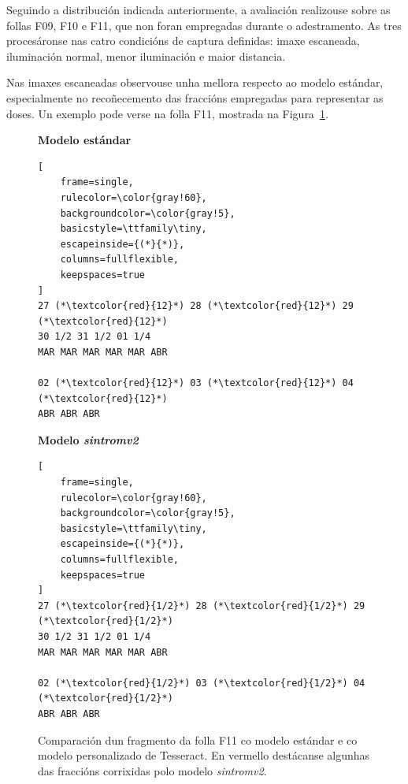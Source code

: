 Seguindo a distribución indicada anteriormente, a avaliación realizouse sobre as follas F09, F10 e F11, que non foran empregadas durante o adestramento. As tres procesáronse nas catro condicións de captura definidas: imaxe escaneada, iluminación normal, menor iluminación e maior distancia.

Nas imaxes escaneadas observouse unha mellora respecto ao modelo estándar, especialmente no recoñecemento das fraccións empregadas para representar as doses. Un exemplo pode verse na folla F11, mostrada na  Figura~\ref{fig:tesseract-comparacion-f11}.

\begin{figure}[h]
\centering

\begin{minipage}[t]{0.48\textwidth}
\centering
\textbf{Modelo estándar}

\begin{lstlisting}[
    frame=single,
    rulecolor=\color{gray!60},
    backgroundcolor=\color{gray!5},
    basicstyle=\ttfamily\tiny,
    escapeinside={(*}{*)},
    columns=fullflexible,
    keepspaces=true
]
27 (*\textcolor{red}{12}*) 28 (*\textcolor{red}{12}*) 29 (*\textcolor{red}{12}*)
30 1/2 31 1/2 01 1/4
MAR MAR MAR MAR MAR ABR

02 (*\textcolor{red}{12}*) 03 (*\textcolor{red}{12}*) 04 (*\textcolor{red}{12}*)
ABR ABR ABR
\end{lstlisting}

\end{minipage}
\hfill
\begin{minipage}[t]{0.48\textwidth}
\centering
\textbf{Modelo \textit{sintromv2}}

\begin{lstlisting}[
    frame=single,
    rulecolor=\color{gray!60},
    backgroundcolor=\color{gray!5},
    basicstyle=\ttfamily\tiny,
    escapeinside={(*}{*)},
    columns=fullflexible,
    keepspaces=true
]
27 (*\textcolor{red}{1/2}*) 28 (*\textcolor{red}{1/2}*) 29 (*\textcolor{red}{1/2}*)
30 1/2 31 1/2 01 1/4
MAR MAR MAR MAR MAR ABR

02 (*\textcolor{red}{1/2}*) 03 (*\textcolor{red}{1/2}*) 04 (*\textcolor{red}{1/2}*)
ABR ABR ABR
\end{lstlisting}

\end{minipage}

\caption{Comparación dun fragmento da folla F11 co modelo estándar e co
modelo personalizado de Tesseract. En vermello destácanse algunhas das
fraccións corrixidas polo modelo \textit{sintromv2}.}
\label{fig:tesseract-comparacion-f11}
\end{figure}

